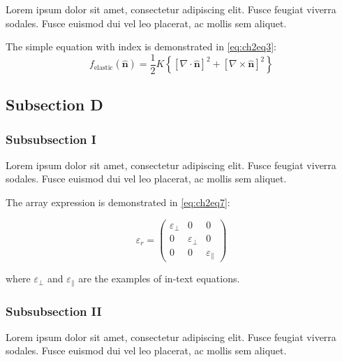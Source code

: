     Lorem ipsum dolor sit amet, consectetur adipiscing elit. Fusce feugiat viverra sodales. Fusce euismod dui vel leo placerat, ac mollis sem aliquet. 
    \par\noindent The simple equation with index is demonstrated in \autoref{eq:ch2eq3}:
    \begin{equation}
        f_{\text{elastic}}(\widehat{\mathbf{n}})=\frac{1}{2}K\left\{{\left[\nabla\cdot\widehat{\mathbf{n}}\right]}^{2}+{\left[\nabla\times\widehat{\mathbf{n}}\right]}^{2}\right\}\label{eq:ch2eq3}
    \end{equation}
    \par\subsection{Subsection D}\label{sec:ch2.sec1.subsec4}
    \par\subsubsection{Subsubsection I}\label{sec:ch2.sec1.subsec4.subsubsec1}
    \par\noindent Lorem ipsum dolor sit amet, consectetur adipiscing elit. Fusce feugiat viverra sodales. Fusce euismod dui vel leo placerat, ac mollis sem aliquet.  
    \par\noindent The array expression is demonstrated in \autoref{eq:ch2eq7}:
    \begin{singlespace}
        \begin{equation}
            \varepsilon_{r}=\left(
            \begin{array}{ccc}
                \varepsilon_{\perp}&0&0\\
                0&\varepsilon_{\perp}&0\\
                0&0&\varepsilon_{\parallel}
            \end{array}\right)\label{eq:ch2eq7}
        \end{equation}
    \end{singlespace}
    where $\varepsilon_{\perp}$ and $\varepsilon_{\parallel}$ are the examples of in-text equations.
    \par\subsubsection{Subsubsection II}\label{sec:ch2.sec1.subsec4.subsubsec2}
    \par\noindent Lorem ipsum dolor sit amet, consectetur adipiscing elit. Fusce feugiat viverra sodales. Fusce euismod dui vel leo placerat, ac mollis sem aliquet.
